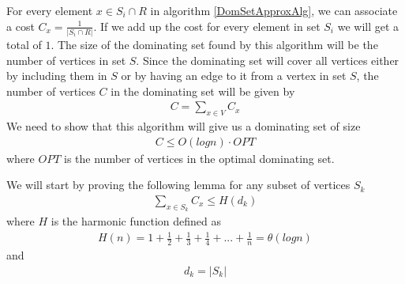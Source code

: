 \documentclass[paper=a4, fontsize=11pt]{scrartcl} %
\numberwithin{figure}{section} %
\numberwithin{table}{section} %
\begin{document}
\begin{enumerate}
For every element $x \in S_i \cap R$ in algorithm \ref{DomSetApproxAlg}, we can associate a cost $C_x = \frac{1}{\left | S_i \cap R \right |}$. If we add up the cost for every element in set $S_i$ we will get a total of $1$. The size of the dominating set found by this algorithm will be the number of vertices in set $S$. Since the dominating set will cover all vertices either by including them in $S$ or by having an edge to it from a vertex in set $S$, the number of vertices $C$ in the dominating set will be given by
\begin{align*} 
C = \sum \limits_{x \in V} C_x
\end{align*}
 We need to show that this algorithm will give us a dominating set of size 
\begin{align*} 
C \leq O(log n) \cdot OPT 
\end{align*}
where $OPT$ is the number of vertices in the optimal dominating set.

We will start by proving the following lemma for any subset of vertices $S_k$
\begin{align} \label{lemma}
\sum \limits_{x \in S_k} C_x \leq H(d_k) 
\end{align}
where $H$ is the harmonic function defined as
\begin{align} \label{HarmonicFunction}
H(n) = 1 + \frac{1}{2} + \frac{1}{3}+ \frac{1}{4} + ... + \frac{1}{n} = \theta (log n)
\end{align}and 
\begin{align*} 
d_k = \left | S_k \right | 
\end{align*}


\end{enumerate}
\end{document}
